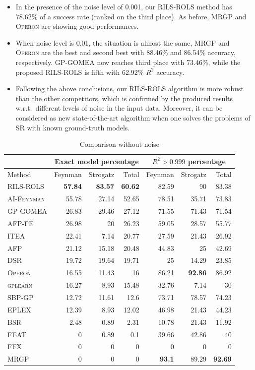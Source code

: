 \documentclass{bmcart}
\begin{document}
\begin{itemize}
	\item  In the presence of the noise level of 0.001, our \textsc{RILS-ROLS} method has 78.62\% of a success rate (ranked on the third place).  As before, \textsc{MRGP} and \textsc{Operon} are showing good performances. 
	
	\item   When noise level is 0.01, the situation is almost the same, \textsc{MRGP} and \textsc{Operon} are the best and second best with 88.46\% and 86.54\% accuracy, respectively. \textsc{GP-GOMEA} now reaches third place with 73.46\%, while the proposed \textsc{RILS-ROLS} is fifth with 62.92\% $R^2$ accuracy.
	
	\item Following the above conclusions, our \textsc{RILS}-\textsc{ROLS} algorithm is more robust than the other competitors, which is confirmed by the produced results w.r.t.\ different levels of noise in the input data. Moreover, it can be considered as new state-of-the-art algorithm when one solves the problems of SR with known ground-truth models. 
	
\end{itemize}

\begin{table}[!htb]
	\caption{Comparison without noise}\label{tab:comp_noise0}
	\centering
	\begin{tabular}{l|rrr|rrr} \hline
		& \multicolumn{3}{c|}{Exact model percentage} & \multicolumn{3}{c}{$R^2 > 0.999$ percentage}\\ \hline
		Method & Feynman & Strogatz & Total & Feynman & Strogatz & Total \\ \hline
		\textsc{RILS-ROLS}&\bf{57.84}&\bf{83.57}&\bf{60.62}&82.59&90&83.38\\
		\textsc{AI-Feynman}&55.78&27.14&52.65&78.51&35.71&73.83\\
		\textsc{GP-GOMEA}&26.83&29.46&27.12&71.55&71.43&71.54\\
		\textsc{AFP-FE}&26.98&20&26.23&59.05&28.57&55.77\\
		\textsc{ITEA}&22.41&7.14&20.77&27.59&21.43&26.92\\
		\textsc{AFP}&21.12&15.18&20.48&44.83&25&42.69\\
		\textsc{DSR}&19.72&19.64&19.71&25&14.29&23.85\\
		\textsc{Operon}&16.55&11.43&16&86.21&\bf{92.86}&86.92\\
		\textsc{gplearn}&16.27&8.93&15.48&32.76&7.14&30\\
		\textsc{SBP-GP}&12.72&11.61&12.6&73.71&78.57&74.23\\
		\textsc{EPLEX}&12.39&8.93&12.02&46.98&21.43&44.23\\
		\textsc{BSR}&2.48&0.89&2.31&10.78&21.43&11.92\\
		\textsc{FEAT}&0&0.89&0.1&39.66&42.86&40\\
		\textsc{FFX}&0&0&0&0&0&0\\
		\textsc{MRGP}&0&0&0&\bf{93.1}&89.29&\bf{92.69}\\
		\hline
	\end{tabular}
\end{table}
\end{document}
